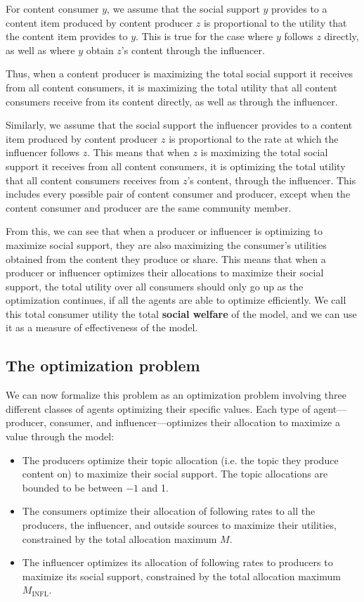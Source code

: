 \documentclass[11pt, letterpaper]{article}
\begin{document}
For content consumer \(y\), we assume that the social support \(y\) provides to a content item produced by content producer \(z\) is proportional to the utility that the content item provides to \(y\). This is true for the case where \(y\) follows \(z\) directly, as well as where \(y\) obtain \(z\)'s content through the influencer. 

Thus, when a content producer is maximizing the total social support it receives from all content consumers, it is maximizing the total utility that all content consumers receive from its content directly, as well as through the influencer. 

Similarly, we assume that the social support the influencer provides to a content item produced by content producer \(z\) is proportional to the rate at which the influencer follows \(z\). This means that when \(z\) is maximizing the total social support it receives from all content consumers, it is optimizing the total utility that all content consumers receives from \(z\)'s content, through the influencer. This includes every possible pair of content consumer and producer, except when the content consumer and producer are the same community member.

From this, we can see that when a producer or influencer is optimizing to maximize social support, they are also maximizing the consumer's utilities obtained from the content they produce or share. This means that when a producer or influencer optimizes their allocations to maximize their social support, the total utility over all consumers should only go up as the optimization continues, if all the agents are able to optimize efficiently. We call this total consumer utility the total \textbf{social welfare} of the model, and we can use it as a measure of effectiveness of the model.

\subsection{The optimization problem}

We can now formalize this problem as an optimization problem involving three different classes of agents optimizing their specific values. Each type of agent---producer, consumer, and influencer---optimizes their allocation to maximize a value through the model:
\begin{itemize}
    \item The producers optimize their topic allocation (i.e. the topic they produce content on) to maximize their social support. The topic allocations are bounded to be between \(-1\) and 1.
    \item The consumers optimize their allocation of following rates to all the producers, the influencer, and outside sources to maximize their utilities, constrained by the total allocation maximum \(M\).
    \item The influencer optimizes its allocation of following rates to producers to maximize its social support, constrained by the total allocation maximum \(M_\text{INFL}\).
\end{itemize}
\end{document}
